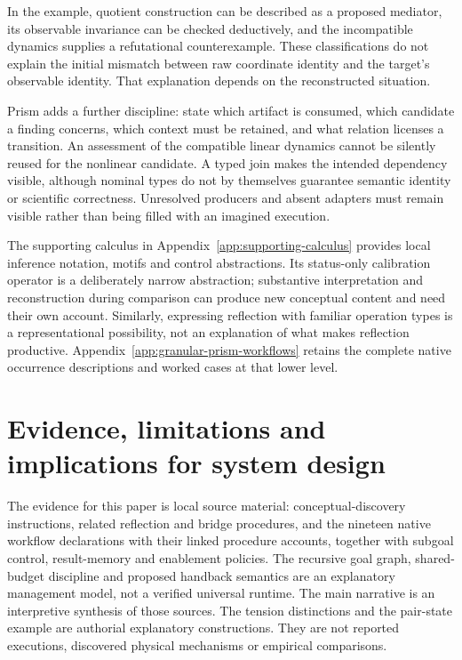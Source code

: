 In the example, quotient construction can be described as a proposed mediator,
its observable invariance can be checked deductively, and the incompatible
dynamics supplies a refutational counterexample. These classifications do not
explain the initial mismatch between raw coordinate identity and the target's
observable identity. That explanation depends on the reconstructed situation.

Prism adds a further discipline: state which artifact is consumed, which
candidate a finding concerns, which context must be retained, and what relation
licenses a transition. An assessment of the compatible linear dynamics cannot
be silently reused for the nonlinear candidate. A typed join makes the intended
dependency visible, although nominal types do not by themselves guarantee semantic
identity or scientific correctness. Unresolved producers and absent adapters
must remain visible rather than being filled with an imagined execution.

The supporting calculus in Appendix~\ref{app:supporting-calculus} provides local
inference notation, motifs and control abstractions. Its status-only calibration
operator is a deliberately narrow abstraction; substantive interpretation and
reconstruction during comparison can produce new conceptual content and need
their own account. Similarly, expressing reflection with familiar operation types
is a representational possibility, not an explanation of what makes reflection
productive. Appendix~\ref{app:granular-prism-workflows} retains the complete native
occurrence descriptions and worked cases at that lower level.

\section{Evidence, limitations and implications for system design}
\label{sec:conceptual-evidence}
The evidence for this paper is local source material: conceptual-discovery
instructions, related reflection and bridge procedures, and the nineteen native
workflow declarations with their linked procedure accounts, together with
subgoal control, result-memory and enablement policies. The recursive goal graph,
shared-budget discipline and proposed handback semantics are an explanatory
management model, not a verified universal runtime. The main narrative
is an interpretive synthesis of those sources. The tension distinctions and
the pair-state example are authorial explanatory constructions. They are not
reported executions, discovered physical mechanisms or empirical comparisons.

